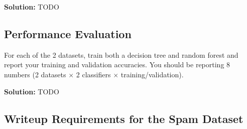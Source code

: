 \documentclass{article}
\newenvironment{solution}{\color{blue} \smallskip \textbf{Solution:}}{}
\begin{document}
\begin{solution}
    TODO
\end{solution}

\newpage
\subsection{\bf Performance Evaluation}
For each of the 2 datasets, train both a decision tree and random forest and report your training and validation accuracies. 
You should be reporting 8 numbers (2 datasets $\times$ 2 classifiers $\times$ training/validation).

\begin{solution}
    TODO
\end{solution}

\newpage
\subsection{Writeup Requirements for the Spam Dataset}
\end{document}
